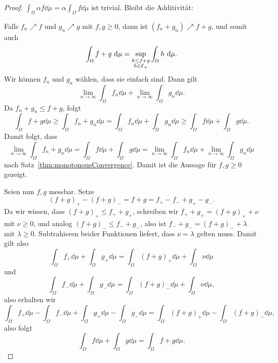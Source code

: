 \documentclass[language=ngerman]{../../Template/TemplateLecture}
\begin{document}
\begin{proof}
    $\int_\Omega \alpha f \dd\mu = \alpha \int_\Omega f \dd\mu$ ist trivial. Bleibt die Additivität:

    Falls $f_n \nearrow f$ und $g_n \nearrow g$ mit $f, g \geq 0$, dann ist $(f_n + g_n) \nearrow f + g$, und somit auch
    \begin{equation}
        \int_\Omega f + g ~\mathrm{d}\mu = \sup_{\substack{h \leq f + g \\ h \in \mathcal{E}_+}} \int_\Omega h ~\mathrm{d}\mu.
    \end{equation}
    Wir können $f_n$ und $g_n$ wählen, dass sie einfach sind. Dann gilt 
    \begin{equation}
        \lim_{n \to \infty} \int_\Omega f_n \dd\mu + \lim_{n \to \infty} \int_\Omega g_n \dd\mu.
    \end{equation}
    Da $f_n + g_n \leq f + g$, folgt 
    \begin{equation}
        \int_\Omega f + g \dd\mu \geq \int_\Omega f_n + g_n \dd\mu = \int_\Omega f_n \dd\mu + \int_\Omega g_n \dd\mu \geq \int_\Omega f \dd\mu + \int_\Omega g \dd\mu.
    \end{equation}
    Damit folgt, dass 
    \begin{equation}
        \lim_{n \to \infty} \int_\Omega f_n + g_n \dd\mu = \int_\Omega f \dd\mu + \int_\Omega g \dd\mu = \lim_{n \to \infty}\int_\Omega f_n \dd\mu + \lim_{n \to \infty} \int_\Omega g_n \dd\mu
    \end{equation}
    nach Satz~\ref{thm:monotonousConvergence}. Damit ist die Aussage für $f, g \geq 0$ gezeigt.

    Seien nun $f, g$ messbar. Setze
    \begin{equation}
        (f + g)_+ - (f + g)_- = f + g = f_+ - f_- + g_+ - g_-.
    \end{equation}
    Da wir wissen, dass $(f + g)_+ \leq f_+ + g_+$, schreiben wir $f_+ + g_+ = (f + g)_+ + \nu$ mit $\nu \geq 0$, und analog $(f + g)_- \leq f_- + g_-$, also ist $f_- + g_- = (f + g)_- + \lambda$ mit $\lambda \geq 0$. Subtrahieren beider Funktionen liefert, dass $\nu = \lambda$ gelten muss. Damit gilt also 
    \begin{equation}
        \int_\Omega f_+ \dd\mu + \int_\Omega g_+ \dd\mu = \int_\Omega (f+g)_+ \dd\mu + \int_\Omega\nu\dd\mu
    \end{equation}
    und
    \begin{equation}
        \int_\Omega f_- \dd\mu + \int_\Omega g_- \dd\mu = \int_\Omega (f+g)_- \dd\mu + \int_\Omega\nu\dd\mu,
    \end{equation}
    also erhalten wir 
    \begin{equation}
        \int_\Omega f_+ \dd\mu - \int_\Omega f_- \dd\mu + \int_\Omega g_+ \dd\mu - \int_\Omega g_- \dd\mu = \int_\Omega (f + g)_+ \dd\mu - \int_\Omega (f + g)_- \dd\mu,
    \end{equation}
    also folgt 
    \begin{equation}
        \int_\Omega f \dd\mu + \int_\Omega g \dd\mu = \int_\Omega f + g \dd\mu.
    \end{equation}
\end{proof}
\end{document}
